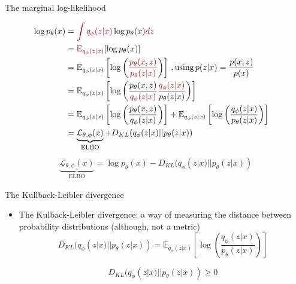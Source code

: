 \documentclass[10pt]{beamer}
\begin{document}
\begin{frame}{The marginal log-likelihood}

\begin{align*}
\log p_\theta(x)&={\color{uured}\int q_\phi(z|x)} \log p_\theta(x) {\color{uured} dz}&  \\
&={\color{uured}\mathbb{E}_{q_\phi(z|x)}}[\log p_\theta(x)] \\
&=\mathbb{E}_{q_\phi(z|x)}\left[\log \left({\color{uured}\frac{p_\theta(x,z)}{p_\theta(z|x)}}\right)\right]\,, \text{using}\, p(z|x)= \frac{p(x,z)}{p(x)} \\
&=\mathbb{E}_{q_\phi(z|x)}\left[\log \left(\frac{p_\theta(x,z)}{{\color{uured}q_\phi(z|x)}}\frac{{\color{uured}q_\phi(z|x)}}{p_\theta(z|x)}\right)\right] \\
&=\mathbb{E}_{q_\phi(z|x)}\left[\log \left(\frac{p_\theta(x,z)}{q_\phi(z|x)}\right)\right] + \mathbb{E}_{q_\phi(z|x)}\left[\log \left(\frac{q_\phi(z|x)}{p_\theta(z|x)}\right)\right] \\
&=\underbrace{\mathcal{L}_{\theta,\phi}(x)}_{\text{ELBO}} + D_{KL}(q_\phi(z|x)||p_\theta(z|x))\\
\end{align*}
\pause
\begin{align*}
\underbrace{\mathcal{L}_{\theta,\phi}(x)}_{\text{ELBO}} = \log p_\theta(x) - D_{KL}(q_\phi(z|x)||p_\theta(z|x))
\end{align*}

\end{frame}


\begin{frame}{The Kullback-Leibler divergence}

\begin{itemize}
\item {\color{uured} The Kulback-Leibler divergence}: a way of measuring the distance between probability distributions (although, not a metric)
\[
D_{KL}(q_\phi(z|x)||p_\theta(z|x)) = \mathbb{E}_{q_\phi(z|x)}\left[\log \left(\frac{q_\phi(z|x)}{p_\theta(z|x)}\right)\right]
\]

\[
D_{KL}(q_\phi(z|x)||p_\theta(z|x)) \geq 0
\]
\end{itemize}

\end{frame}
\end{document}

